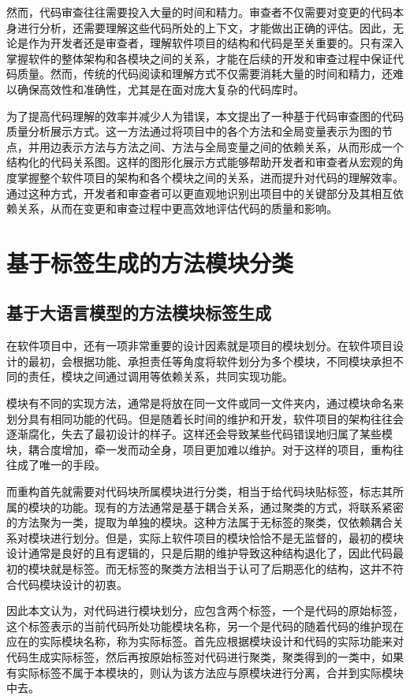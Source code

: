 然而，代码审查往往需要投入大量的时间和精力\cite{花子涵2024代码审查自动化研究综述}。审查者不仅需要对变更的代码本身进行分析，还需要理解这些代码所处的上下文，才能做出正确的评估。因此，无论是作为开发者还是审查者，理解软件项目的结构和代码是至关重要的。只有深入掌握软件的整体架构和各模块之间的关系，才能在后续的开发和审查过程中保证代码质量。然而，传统的代码阅读和理解方式不仅需要消耗大量的时间和精力，还难以确保高效性和准确性，尤其是在面对庞大复杂的代码库时。

为了提高代码理解的效率并减少人为错误，本文提出了一种基于代码审查图的代码质量分析展示方式。这一方法通过将项目中的各个方法和全局变量表示为图的节点，并用边表示方法与方法之间、方法与全局变量之间的依赖关系，从而形成一个结构化的代码关系图。这样的图形化展示方式能够帮助开发者和审查者从宏观的角度掌握整个软件项目的架构和各个模块之间的关系，进而提升对代码的理解效率。通过这种方式，开发者和审查者可以更直观地识别出项目中的关键部分及其相互依赖关系，从而在变更和审查过程中更高效地评估代码的质量和影响。

\section{基于标签生成的方法模块分类}
\subsection{基于大语言模型的方法模块标签生成}

在软件项目中，还有一项非常重要的设计因素就是项目的模块划分。在软件项目设计的最初，会根据功能、承担责任等角度将软件划分为多个模块，不同模块承担不同的责任，模块之间通过调用等依赖关系，共同实现功能。

模块有不同的实现方法，通常是将放在同一文件或同一文件夹内，通过模块命名来划分具有相同功能的代码。但是随着长时间的维护和开发，软件项目的架构往往会逐渐腐化，失去了最初设计的样子。这样还会导致某些代码错误地归属了某些模块，耦合度增加，牵一发而动全身，项目更加难以维护。对于这样的项目，重构往往成了唯一的手段。

而重构首先就需要对代码块所属模块进行分类，相当于给代码块贴标签，标志其所属的模块的功能。现有的方法通常是基于耦合关系，通过聚类的方式\cite{2017Extraction}，将联系紧密的方法聚为一类，提取为单独的模块。这种方法属于无标签的聚类，仅依赖耦合关系对模块进行划分。但是，实际上软件项目的模块恰恰不是无监督的，最初的模块设计通常是良好的且有逻辑的，只是后期的维护导致这种结构退化了，因此代码最初的模块就是标签。而无标签的聚类方法相当于认可了后期恶化的结构，这并不符合代码模块设计的初衷。

因此本文认为，对代码进行模块划分，应包含两个标签，一个是代码的原始标签，这个标签表示的当前代码所处功能模块名称，另一个是代码的随着代码的维护现在应在的实际模块名称，称为实际标签。首先应根据模块设计和代码的实际功能来对代码生成实际标签，然后再按原始标签对代码进行聚类，聚类得到的一类中，如果有实际标签不属于本模块的，则认为该方法应与原模块进行分离，合并到实际模块中去。

